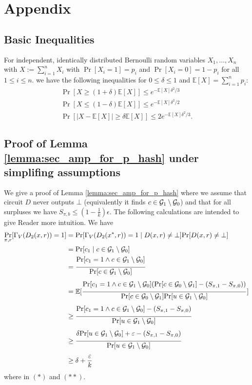 \chapter{Appendix}
\section{Basic Inequalities}
\begin{lemma}
For independent, identically distributed Bernoulli random variables $X_1, \dots, X_n$ with $X := \sum_{i=1}^n X_i$
with $\Pr[X_i = 1] = p_i$ and $\Pr[X_i = 0] = 1 - p_i$ for all $ 1 \leq  i \leq n$.
we have the following inequalities for $0 \leq \delta \leq 1$ and $\mathbb{E}[X] = \sum_{i=1}^{n} p_i$:
\begin{gather}
\label{ineq:ch0}
\Pr[X \geq (1+\delta) \mathbb{E}[X]] \leq e^{- \mathbb{E}[X] \delta^2/3} \\
\label{ineq:ch1}
\Pr[X \leq (1-\delta) \mathbb{E}[X]] \leq e^{- \mathbb{E}[X] \delta^2/2} \\
\label{ineq:ch2}
\Pr[|X - \mathbb{E}[X]| \geq \delta \mathbb{E}[X]] \leq 2 e^{- \mathbb{E}[X] \delta^2 / 3}.
\end{gather}
\end{lemma}

\section{Proof of Lemma \ref{lemma:sec_amp_for_p_hash} under simplifing assumptions}
We give a proof of Lemma \ref{lemma:sec_amp_for_p_hash} where we assume that circuit $D$ never outputs $\bot$ (equivalently it finds
$c \in \mathcal{G}_1 \setminus \mathcal{G}_0$) and that for all surpluses we have $S_{\pi,b} \leq (1 - \frac{1}{k})\epsilon$.
The following calculations are intended to give Reader more intuition.
We have
\begin{align*}
  \underset{\pi, r}{\Pr}[\Gamma_V(D_2(x,r)) = 1] &= \underset{}{\Pr}[\Gamma_V(D_2(x^*,r)) = 1 \mid D(x,r) \neq \bot] \underset{}{\Pr}[D(x,r) \neq \bot] \\
  &= \Pr[c_1 \mid c \in \mathcal{G}_1 \setminus \mathcal{G}_0] \\
  &= \frac{\underset{}{\Pr}[c_1 = 1 \land c \in \mathcal{G}_1 \setminus \mathcal{G}_0]}{\underset{}{\Pr}[c \in \mathcal{G}_1 \setminus \mathcal{G}_0]} \\
  &= \mathbb{E}[\frac{\underset{}{\Pr}[c_1 = 1 \land c \in \mathcal{G}_1 \setminus \mathcal{G}_0] ( \underset{}{\Pr}[c \in \mathcal{G}_0 \setminus \mathcal{G}_1] - (S_{\pi,1} - S_{\pi,0}))}
  {\underset{}{\Pr}[c \in \mathcal{G}_0 \setminus \mathcal{G}_1] \underset{}{\Pr}[u \in \mathcal{G}_1 \setminus \mathcal{G}_0]}]  \\
  &\geq \frac{\underset{}{\Pr}[c_1 = 1 \land c \in \mathcal{G}_1 \setminus \mathcal{G}_0] - (S_{\pi,1} - S_{\pi,0})}{\underset{}{\Pr}[u \in \mathcal{G}_1 \setminus \mathcal{G}_0]} \\
  &\geq \frac{\delta \underset{}{\Pr}[u \in \mathcal{G}_1 \setminus \mathcal{G}_0] + \varepsilon - (S_{\pi,1} - S_{\pi,0})}{\underset{}{\Pr}[u \in \mathcal{G}_1 \setminus \mathcal{G}_0]} \\
  &\geq \delta + \frac{\varepsilon}{k}
\end{align*}
where in $(*)$ and $(**)$.